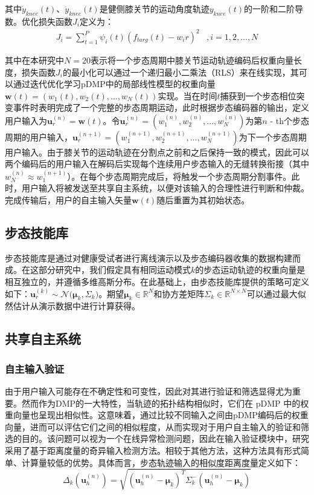 其中${\dot y_{knee}}(t)$、${\ddot y_{knee}}(t)$是健侧膝关节的运动角度轨迹${y_{knee}}(t)$的一阶和二阶导数。优化损失函数${J_i}$定义为：
\begin{equation}
  \label{deqn_ex12}
  \begin{array}{*{20}{c}}
    {{J_i} = \sum\limits_{t = 1}^P {{\psi _i}} (t){{\left( {{f_{targ}}(t) - {w_i}r} \right)}^2}}&{,i = 1,2,...,N} 
  \end{array}
\end{equation}       

其中在本研究中$N=20$表示将一个步态周期中膝关节运动轨迹编码后权重向量长度，损失函数${J_i}$的最小化可以通过一个递归最小二乘法（RLS）来在线实现，其可以通过迭代优化学习pDMP中的局部线性模型的权重向量$\pmb{w}(t)=({w_1}(t),{w_2}(t),...,{w_N}(t))$实现。当在时间$t$捕获到一个步态相位突变事件时表明完成了一个完整的步态周期运动，此时根据步态编码器的输出，定义用户输入为$\pmb{u}_r^{(n)} = \pmb{w}(t)$。令$\pmb{u}_r^{(n)} = (w_1^{(n)},w_2^{(n)},...,w_N^{(n)})$为第$n{\text{ - th}}$个步态周期的用户输入，$\pmb{u}_r^{(n + 1)} = (w_1^{(n + 1)},w_2^{(n + 1)},...,w_N^{(n + 1)})$为下一个步态周期用户输入。由于膝关节的运动轨迹在分割点之前和之后保持一致的模式，因此可以两个编码后的用户输入在解码后实现每个连续用户步态输入的无缝转换衔接（其中$w_N^{(n)}\approx w_1^{(n+1)}$）。在每个步态周期完成后，将触发一个步态周期分割事件。此时，用户输入将被发送至共享自主系统，以便对该输入的合理性进行判断和仲裁。完成传输后，用户的自主输入矢量$\pmb{w}(t)$随后重置为其初始状态。

\subsection{步态技能库}步态技能库是通过对健康受试者进行离线演示以及步态编码器收集的数据构建而成。在这部分研究中，我们假定具有相同运动模式$ k $的步态运动轨迹的权重向量是相互独立的，并遵循多维高斯分布。在此基础上，由步态技能库提供的策略可定义如下：$\pmb{u}_r^{(k)}\sim {\mathcal{N}}\pmb{(}{{\pmb{\mu }}_k},{\Sigma _k}\pmb{)}$。期望${{\pmb{\mu }}_k} \in {\mathbb{R}^N}$和协方差矩阵${\Sigma _k} \in {\mathbb{R}^{N \times N}}$可以通过最大似然估计从演示数据中进行计算获得。  
\subsection{共享自主系统}
\subsubsection{自主输入验证}由于用户输入可能存在不确定性和可变性，因此对其进行验证和筛选显得尤为重要。然而作为DMP的一大特性，当轨迹的拓扑结构相似时，它们在 pDMP 中的权重向量也呈现出相似性。这意味着，通过比较不同输入之间由pDMP编码后的权重向量，进而可以评估它们之间的相似程度，从而实现对于用户自主输入的验证和筛选的目的\cite{ijspeertDynamicalMovementPrimitives2013}。该问题可以视为一个在线异常检测问题，因此在输入验证模块中，研究采用了基于距离度量的奇异输入检测方法。相较于其他方法，这种方法具有形式简单、计算量较低的优势。具体而言，步态轨迹输入的相似度距离度量定义如下：
\begin{equation}
  \label{deqn_ex13}
  {\Delta _k}({\pmb{u}}_h^{(n)}) = \sqrt {{{({\pmb{u}}_h^{(n)} - {{\pmb{\mu }}_k})}^T}\Sigma _k^ - ({\pmb{u}}_h^{(n)} - {{\pmb{\mu }}_k})} 
\end{equation}   

